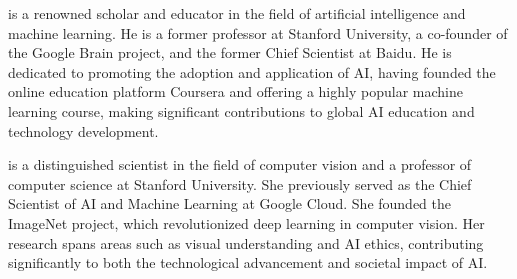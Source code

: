 \documentclass{article}
\begin{document}
\noindent
\begin{minipage}[t]{0.45\linewidth}
	\par\noindent 
	\parbox[t]{\linewidth}{
		\noindent{}
		 is a renowned scholar and educator in the field of artificial intelligence and machine learning. He is a former professor at Stanford University, a co-founder of the Google Brain project, and the former Chief Scientist at Baidu. He is dedicated to promoting the adoption and application of AI, having founded the online education platform Coursera and offering a highly popular machine learning course, making significant contributions to global AI education and technology development.}
\end{minipage}
\hfill
\begin{minipage}[t]{0.45\linewidth}
	\parbox[t]{\linewidth}{
		\noindent{}
		 is a distinguished scientist in the field of computer vision and a professor of computer science at Stanford University. She previously served as the Chief Scientist of AI and Machine Learning at Google Cloud. She founded the ImageNet project, which revolutionized deep learning in computer vision. Her research spans areas such as visual understanding and AI ethics, contributing significantly to both the technological advancement and societal impact of AI.}
\end{minipage}
\end{document}
